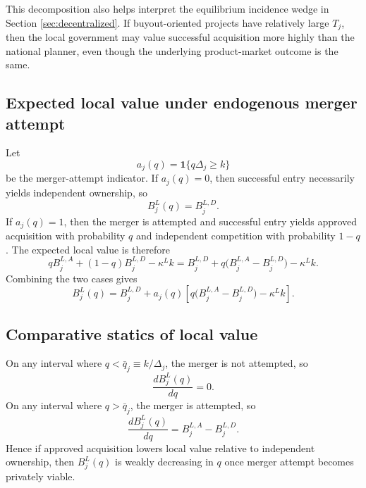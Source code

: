 This decomposition also helps interpret the equilibrium incidence wedge in Section \ref{sec:decentralized}.
If buyout-oriented projects have relatively large \(T_j\), then the local government may value successful acquisition more highly than the national planner, even though the underlying product-market outcome is the same.

\subsection{Expected local value under endogenous merger attempt}

Let
\begin{equation}
    a_j(q)=\mathbf{1}\{q\Delta_j \ge k\}
\end{equation}
be the merger-attempt indicator.
If \(a_j(q)=0\), then successful entry necessarily yields independent ownership, so
\begin{equation}
    B_j^L(q)=B_j^{L,D}.
\end{equation}
If \(a_j(q)=1\), then the merger is attempted and successful entry yields approved acquisition with probability \(q\) and independent competition with probability \(1-q\).
The expected local value is therefore
\begin{equation}
    q B_j^{L,A} + (1-q)B_j^{L,D} - \kappa^L k
    =
    B_j^{L,D}
    +
    q\bigl(B_j^{L,A}-B_j^{L,D}\bigr)
    -
    \kappa^L k.
\end{equation}
Combining the two cases gives
\begin{equation}
    B_j^L(q)
    =
    B_j^{L,D}
    +
    a_j(q)
    \left[
        q\bigl(B_j^{L,A}-B_j^{L,D}\bigr)
        -
        \kappa^L k
    \right].
\end{equation}

\subsection{Comparative statics of local value}

On any interval where \(q<\bar q_j \equiv k/\Delta_j\), the merger is not attempted, so
\begin{equation}
    \frac{d B_j^L(q)}{dq}=0.
\end{equation}
On any interval where \(q>\bar q_j\), the merger is attempted, so
\begin{equation}
    \frac{d B_j^L(q)}{dq}
    =
    B_j^{L,A}-B_j^{L,D}.
\end{equation}
Hence if approved acquisition lowers local value relative to independent ownership, then \(B_j^L(q)\) is weakly decreasing in \(q\) once merger attempt becomes privately viable.

